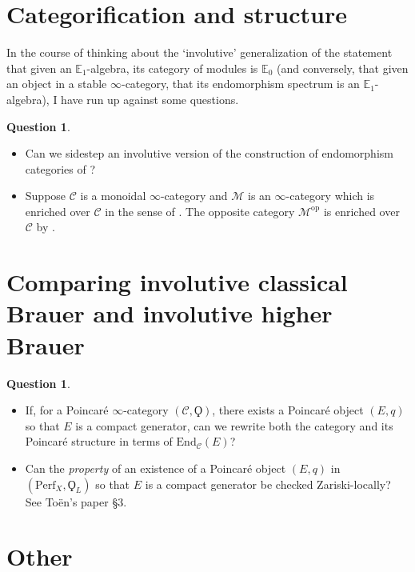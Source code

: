 \documentclass{article}
\newcommand{\EE}{\mathbb{E}}
\newcommand{\op}{\mathrm{op}}
\theoremstyle{definition}
\newtheorem{question}[theorem]{Question}
\begin{document}
\section{Categorification and structure}
In the course of thinking about the `involutive' generalization of the statement that given an $ \EE_1 $-algebra, its category of modules is $ \EE_0 $ (and conversely, that given an object in a stable $\infty$-category, that its endomorphism spectrum is an $ \EE_1 $-algebra), I have run up against some questions. 
\begin{question}
\begin{itemize}
    \item Can we sidestep an involutive version of the construction of endomorphism categories of \cite[\S4.7.1]{LurHA}? 
    \item Suppose $ \mathcal{C} $ is a monoidal $ \infty $-category and $ \mathcal{M} $ is an $ \infty $-category which is enriched over $ \mathcal{C} $ in the sense of \cite[\S4.2.1]{LurHA}. 
    The opposite category $ \mathcal{M}^\op $ is enriched over $ \mathcal{C} $ by \cite[\S10]{Heine_2023}.   
\end{itemize}
\end{question}

\section{Comparing involutive classical Brauer and involutive higher Brauer}
\begin{question}
\begin{itemize}
    \item If, for a Poincaré $ \infty $-category $ (\mathcal{C},\Qoppa) $, there exists a Poincaré object $(E,q) $ so that $ E $ is a compact generator, can we rewrite both the category and its Poincaré structure in terms of $ \mathrm{End}_{\mathcal{C}}(E) $? 
    \item Can the \emph{property} of an existence of a Poincaré object $ (E,q) $ in $ \left(\mathrm{Perf}_X, \Qoppa_L \right) $ so that $ E $ is a compact generator be checked Zariski-locally? 
    See Toën's paper \S3.  
\end{itemize}
\end{question}

\section{Other} 
\end{document}
